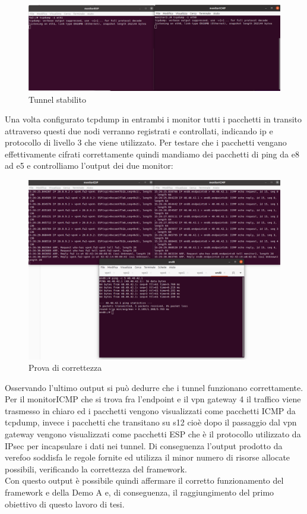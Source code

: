 \begin{figure}[h] 
    \centering
    \includegraphics[width=1\textwidth]{(04)MonitorsConfig.png} 
    \caption{Tunnel stabilito}
    \label{fig:VPNDeploy}
\end{figure}

Una volta configurato tcpdump in entrambi i monitor tutti i pacchetti in transito attraverso questi due nodi verranno registrati e controllati, indicando ip e protocollo di livello 3 che viene utilizzato.
Per testare che i pacchetti vengano effettivamente cifrati correttamente quindi mandiamo dei pacchetti di ping da e8 ad e5 e controlliamo l'output dei due monitor:

\begin{figure}[H] 
    \centering
    \includegraphics[width=1\textwidth]{(05)Correctness Proof.png} 
    \caption{Prova di correttezza}
    \label{fig:VPNDeploy}
\end{figure}

Osservando l'ultimo output si può dedurre che i tunnel funzionano correttamente.
Per il monitorICMP che si trova fra l'endpoint e il vpn gateway 4 il traffico viene trasmesso in chiaro ed i pacchetti vengono visualizzati come pacchetti ICMP da tcpdump, invece i pacchetti che transitano su s12 cioè dopo il passaggio dal vpn gateway vengono visualizzati come pacchetti ESP che è il protocollo utilizzato da IPsec per incapsulare i dati nei tunnel. Di conseguenza l'output prodotto da verefoo soddisfa le regole fornite ed utilizza il minor numero di risorse allocate possibili, verificando la correttezza del framework.\\
Con questo output è possibile quindi affermare il corretto funzionamento del framework e della Demo A e, di conseguenza, il raggiungimento del primo obiettivo di questo lavoro di tesi.